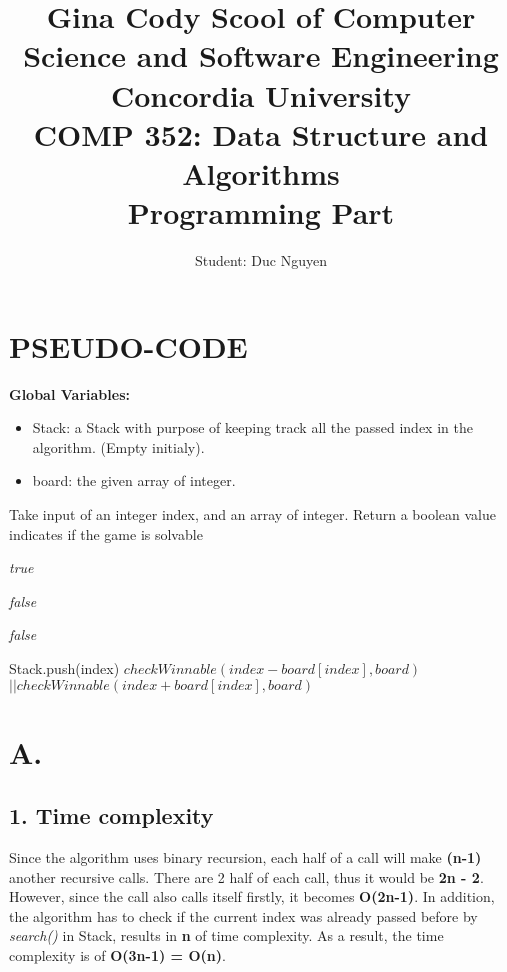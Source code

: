 \documentclass[16pt, letterpaper]{article}
\title{Gina Cody Scool of Computer Science and Software Engineering \\Concordia University
\\COMP 352: Data Structure and Algorithms
\\Programming Part}
\author{Student: Duc Nguyen}
\date{}
\begin{document}
\begin{titlepage}
\maketitle
\end{titlepage}

\section*{PSEUDO-CODE}
\textbf{Global Variables:}
\begin{itemize}
    \item Stack: a Stack with purpose of keeping track all the passed index in the algorithm. (Empty initialy). 
    \item board: the given array of integer.
\end{itemize}
\begin{algorithm}[H]
\caption{Take input of an integer index, and an  array of integer. Return a boolean value indicates if the game is solvable}
\begin{algorithmic}[1]
\State \Return \textit{true}
\EndIf

\State \Return \textit{false}
\EndIf

\State \Return \textit{false}
\EndIf

\State Stack.push(index) 
\State\Return \textit{$checkWinnable(index-board[index], board)$
\State $|| checkWinnable(index+board[index], board)$}
\EndProcedure
\end{algorithmic}
\end{algorithm}

\section*{A.}
\subsection*{1. Time complexity}
Since the algorithm uses binary recursion, each half of a call will make \textbf{(n-1)} another recursive calls. There are 2 half of each call, thus it would be \textbf{2n - 2}. However, since the call also calls itself firstly, it becomes \textbf{O(2n-1)}. In addition, the algorithm has to check if the current index was already passed before by \textit{search()} in Stack, results in \textbf{n} of time complexity.
As a result, the time complexity is of \textbf{O(3n-1) = O(n)}.
\end{document}
